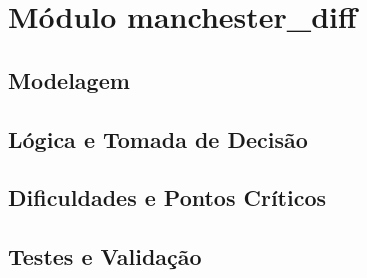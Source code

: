 ﻿%
\section{Módulo manchester_diff}
\subsection{Modelagem}
\subsection{Lógica e Tomada de Decisão}
\subsection{Dificuldades e Pontos Críticos}
\subsection{Testes e Validação}

